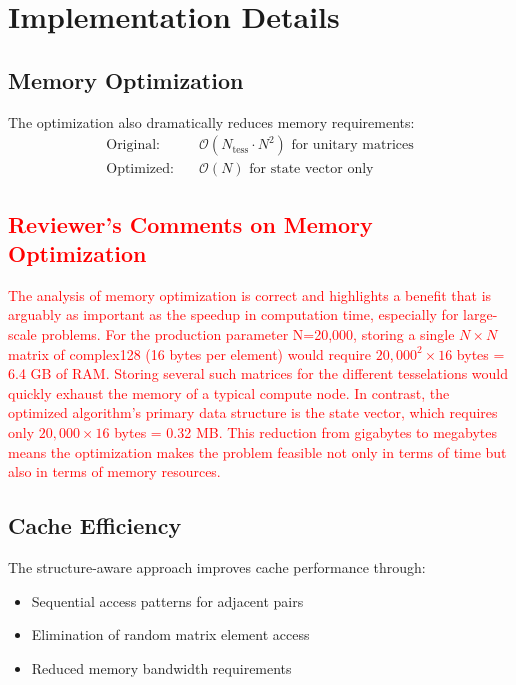 \documentclass[11pt,a4paper]{article}
\newcommand{\bigO}{\mathcal{O}}
\begin{document}
\section{Implementation Details}

\subsection{Memory Optimization}

The optimization also dramatically reduces memory requirements:
\begin{align}
\text{Original:} \quad &\bigO(N_{\text{tess}} \cdot N^2) \text{ for unitary matrices}\\
\text{Optimized:} \quad &\bigO(N) \text{ for state vector only}
\end{align}

\textcolor{red}{
\subsection*{Reviewer's Comments on Memory Optimization}
The analysis of memory optimization is correct and highlights a benefit that is arguably as important as the speedup in computation time, especially for large-scale problems. For the production parameter N=20,000, storing a single $N \times N$ matrix of complex128 (16 bytes per element) would require $20,000^2 \times 16$ bytes = 6.4 GB of RAM. Storing several such matrices for the different tesselations would quickly exhaust the memory of a typical compute node. In contrast, the optimized algorithm's primary data structure is the state vector, which requires only $20,000 \times 16$ bytes = 0.32 MB. This reduction from gigabytes to megabytes means the optimization makes the problem feasible not only in terms of time but also in terms of memory resources.
}

\subsection{Cache Efficiency}

The structure-aware approach improves cache performance through:
\begin{itemize}
\item Sequential access patterns for adjacent pairs
\item Elimination of random matrix element access
\item Reduced memory bandwidth requirements
\end{itemize}
\end{document}
